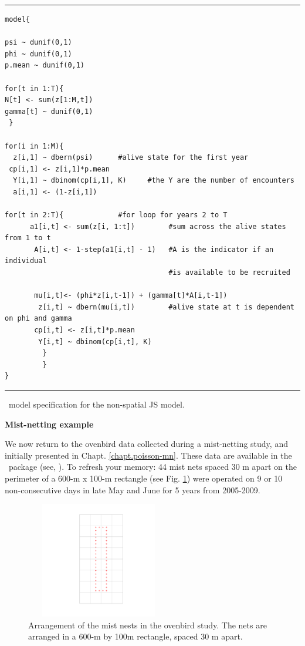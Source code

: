 \begin{panel}[htp]
\centering
\rule[0.1in]{\textwidth}{.03in}
{\small
\begin{verbatim}
model{

psi ~ dunif(0,1)
phi ~ dunif(0,1)
p.mean ~ dunif(0,1)

for(t in 1:T){
N[t] <- sum(z[1:M,t])
gamma[t] ~ dunif(0,1)
 }

for(i in 1:M){                
  z[i,1] ~ dbern(psi)	   #alive state for the first year
 cp[i,1] <- z[i,1]*p.mean  
  Y[i,1] ~ dbinom(cp[i,1], K)     #the Y are the number of encounters
  a[i,1] <- (1-z[i,1])

for(t in 2:T){			   #for loop for years 2 to T
      a1[i,t] <- sum(z[i, 1:t])        #sum across the alive states from 1 to t
       A[i,t] <- 1-step(a1[i,t] - 1)   #A is the indicator if an individual 
									   #is available to be recruited

       mu[i,t]<- (phi*z[i,t-1]) + (gamma[t]*A[i,t-1])   
        z[i,t] ~ dbern(mu[i,t])        #alive state at t is dependent on phi and gamma
       cp[i,t] <- z[i,t]*p.mean
        Y[i,t] ~ dbinom(cp[i,t], K)
         }
         }
}
\end{verbatim}
}

\rule[-0.1in]{\textwidth}{.03in}
\caption{
\jags~model specification for the non-spatial JS model.}
\label{open.panel.nsJS}
\end{panel}



{\bf Mist-netting example}

We now return to the ovenbird data collected during a mist-netting
study, and initially presented in Chapt. \ref{chapt.poisson-mn}.  These data are available
in the \secr~package (see, \citet{efford_etal:2004,
  borchers_efford:2008}). To refresh your memory: 44 mist nets spaced
30 m apart on the perimeter of a 600-m x 100-m rectangle (see
Fig. \ref{open.figs.ovenbirdlocs}) were operated on 9 or 10 non-consecutive days in late May
and June for 5 years from 2005-2009.

\begin{figure}
\centering
\includegraphics[height=2in,width=2.5in]{Ch16-Open/figs/ovenbirds.pdf}
\caption{Arrangement of the mist nests in the ovenbird study.  The nets are arranged in a 600-m by 100m
rectangle, spaced 30 m apart. }
\label{open.figs.ovenbirdlocs}
\end{figure}


